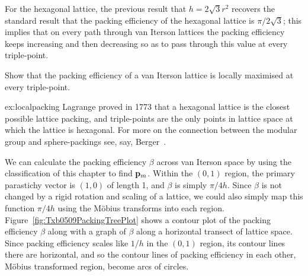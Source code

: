 For the hexagonal lattice, the previous result that $h= 2\sqrt{3} r^2$ 
recovers the standard result that the packing efficiency of the hexagonal lattice is $\pi/2\sqrt{3}$; this implies that on every path through van Iterson lattices the packing efficiency keeps increasing and then decreasing so as to pass through this value at every triple-point.  
\begin{jExercise}\label{ex:localpacking}
Show that the packing efficiency of a van Iterson lattice is locally maximised at every triple-point.
\end{jExercise}
\begin{jAnswer}{ex:localpacking}
	Lagrange proved in 1773 that a hexagonal lattice is the closest possible lattice packing, and triple-points are the only points in lattice space at which the lattice is hexagonal. For more on the connection between the modular group and sphere-packings see, say, Berger~\cite{bergerGeometryRevealedJacob2010}.
\end{jAnswer}
We can calculate the packing efficiency $\beta$ across van Iterson space by using the classification of this chapter to find ${\mathbf p}_{m}$.  Within the $(0,1)$ region, the primary parastichy vector is $(1,0)$ of length 1, and $\beta$ is simply $\pi/ {4 h }$.  Since $\beta$ is not changed by a rigid rotation and scaling of a lattice, we could also simply map this function  $\pi/ {4 h }$ using the M{\"o}bius transforms into each region. Figure~\ref{fig:Txb0509PackingTreePlot} shows a contour plot of the packing efficiency $\beta$ along with a graph of $\beta$ along a horizontal transect of lattice space.
%
Since packing efficiency scales like $1/h$ in the $(0,1)$ region, its contour lines there are horizontal, and so the contour lines of packing efficiency in each other, M{\"o}bius transformed region, become arcs of circles. 

